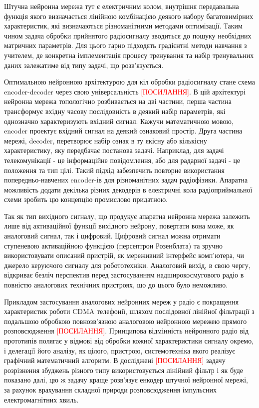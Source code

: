 Штучна нейронна мережа тут є електричним колом, внутрішня передавальна 
функція якого визначається лінійною комбінацією деякого набору багатовимірних 
характеристик, які визначаються різноманітними методами оптимізації. Таким 
чином задача обробки прийнятого радіосигналу зводиться до пошуку необхідних 
матричних параметрів. Для цього гарно підходять градієнтні методи навчання 
з учителем, де конкретна імплементація процесу тренування та набір 
тренувальних даних залежатиме від типу задачі, що розв'язується.

Оптимальною нейронною архітектурою для кіл обробки радіосигналу стане
схема encoder-decoder через свою універсальність \textcolor{red}{[ПОСИЛАННЯ]}. 
В цій архітектурі нейронна мережа топологічно розбивається на 
дві частини, перша частина трансформує вхідну часову послідовність в деякий 
набір параметрів, які однозначно характеризують вхідний сигнал. Кажучи 
математичною мовою, encoder проектує вхідний сигнал на деякий ознаковий
простір. Друга частина мережі, decoder, перетворює набір ознак в ту якісну 
або кількісну характеристику, яку передбачає постанова задачі. Наприклад,
для задачі телекомунікації - це інформаційне повідомлення, або для радарної 
задачі - це положення та тип цілі. Такий підхід забезпечить повторне 
використання попередньо-навчених encoder-ів для різноманітних задач 
радіофізики. Апаратна можливість додати декілька різних декодерів в 
електричні кола радіоприймальної схеми зробить цю концепцію промислово 
придатною.

Так як тип вихідного сигналу, що продукує апаратна нейронна мережа залежить
лише від активаційної функції вихідного нейрону, повертати вона може, як 
аналоговий сигнал, так і цифровий. Цифровий сигнал можна отримати ступеневою 
активаційною функцією (персептрон Розенблата) та зручно використовувати 
описаний пристрій, як мереживний інтерфейс комп'ютера, чи джерело керуючого 
сигналу для робототехніки. Аналоговий вихід, в свою чергу, відкриває безліч 
перспектив перед застосуванням надширокосмугового радіо в повністю 
аналогових технічних пристроях, що до цього було неможливо.

Прикладом застосування аналогових нейронних мереж у радіо є покращення 
характеристик роботи CDMA телефонії, шляхом послідовної лінійної фільтрації
з подальшою обробкою повнозв'язною аналоговою нейронною мережею прямого 
розповсюдження \textcolor{red}{[ПОСИЛАННЯ]}. Принципова відмінність нейронного
радіо від прототипів полягає у відмові від обробки кожної характеристики 
сигналу окремо, і делегації його аналізу, як цілого, пристрою, системотехніка 
якого реалізує графічний математичний алгоритм. В досліджені 
\textcolor{red}{[ПОСИЛАННЯ]} задачу розрізнення збуджень різного типу 
використовується лінійний фільтр і як буде показано далі, цю ж задачу 
краще розв'язує енкодер штучної нейронної мережі, за рахунок врахування
складної природи розповсюдження імпульсних електромагнітних хвиль.

